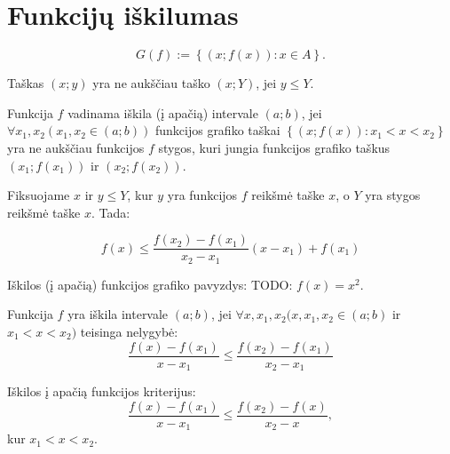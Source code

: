 \section{Funkcijų iškilumas}

\begin{defn}
  \begin{equation*}
    G(f) := \left\{ (x; f(x)) : x \in A \right\}.
  \end{equation*}
\end{defn}

\begin{defn}
  Taškas $(x; y)$ yra ne aukščiau taško $(x; Y)$, jei $y \leq Y$.
\end{defn}

\begin{defn}
  Funkcija $f$ vadinama iškila (į apačią) intervale $(a; b)$, jei
  $\forall x_{1}, x_{2} (x_{1},x_{2} \in (a; b))$ funkcijos grafiko
  taškai $\left\{ (x; f(x)) : x_{1} < x < x_{2} \right\}$
  yra ne aukščiau funkcijos $f$ stygos, kuri jungia funkcijos 
  grafiko taškus $(x_{1}; f(x_{1}))$ ir $(x_{2}; f(x_{2}))$.

  Fiksuojame $x$ ir $y \leq Y$, kur $y$ yra funkcijos $f$ reikšmė 
  taške $x$, o $Y$ yra stygos reikšmė taške $x$. Tada:

  \begin{equation*}
    f(x) \leq 
      \frac{f(x_{2}) - f(x_{1})}{x_{2} - x_{1}}(x - x_{1}) + f(x_{1})
  \end{equation*}
\end{defn}

\begin{exmp}
  Iškilos (į apačią) funkcijos grafiko pavyzdys: TODO: $f(x) = x^{2}$.
\end{exmp}

\begin{defn}
  Funkcija $f$ yra iškila intervale $(a; b)$, jei
  $\forall x, x_{1}, x_{2} (x, x_{1}, x_{2} \in (a; b)$ ir
  $x_{1} < x < x_{2})$ teisinga nelygybė:
  \begin{equation*}
    \frac{f(x) - f(x_{1})}{x - x_{1}} 
    \leq \frac{f(x_{2}) - f(x_{1})}{x_{2} - x_{1}}
  \end{equation*}
\end{defn}

\begin{defn}
  Iškilos į apačią funkcijos kriterijus:
  \begin{equation*}
    \frac{f(x) - f(x_{1})}{x - x_{1}} 
    \leq \frac{f(x_{2}) - f(x)}{x_{2} - x},
  \end{equation*}
  kur $x_{1} < x < x_{2}$.
\end{defn}

